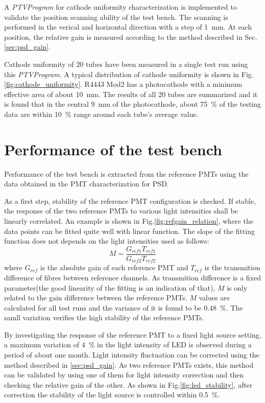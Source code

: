 \documentclass[5p, times]{elsarticle}
\begin{document}
A \textit{PTVProgram} for cathode uniformity characterization is implemented to validate the position scanning ability of the test bench.
The scanning is performed in the verical and horizontal direction with a step of \SI{1}{\milli\meter}.
At each position, the relative gain is measured according to the method described in Sec.\ref{sec:psd_gain}.

Cathode uniformity of 20 tubes have been measured in a single test run using this \textit{PTVProgram}.
A typical distribution of cathode uniformity is shown in Fig.\ref{fig:cathode_uniformity}.
R4443 Mod2 has a photocathode with a minimum effective area of about \SI{10}{\milli\meter}.
The results of all 20 tubes are summarized and it is found that in the central \SI{9}{\milli\meter} of the photocathode, about \SI{75}{\percent} of the testing data are within \textpm\SI{10}{\percent} range around each tube's average value.

\section{Performance of the test bench}
\label{sec:performance}

Performance of the test bench is extracted from the reference PMTs using the data obtained in the PMT characterization for PSD.

As a first step, stability of the reference PMT configuration is checked.
If stable, the response of the two reference PMTs to various light intensities shall be linearly correlated.
An example is shown in Fig.\ref{fig:refgain_relation}, where the data points can be fitted quite well with linear function.
The slope of the fitting function does not depends on the light intensities used as follows:
\begin{equation}
 M = \frac{G_{ref1} T_{ref1}}{G_{ref2} T_{ref2}}
\end{equation}
where $G_{ref}$ is the absolute gain of each reference PMT and $T_{ref}$ is the transmition difference of fibres between reference channels.
As transmition difference is a fixed parameter(the good linearity of the fitting is an indication of that), $M$ is only related to the gain difference between the reference PMTs.
$M$ values are calculated for all test runs and the variance of it is found to be \SI{0.48}{\percent}.
The samll variation verifies the high stability of the reference PMTs.

By investigating the response of the reference PMT to a fixed light source setting, a maximum variation of \SI{4}{\percent} in the light intensity of LED is observed during a period of about one month.
Light intensity fluctuation can be corrected using the method described in \ref{sec:psd_gain}.
As two reference PMTs exists, this method can be validated by using one of them for light intensity correction and then checking the relative gain of the other. 
As shown in Fig.\ref{fig:led_stability}, after correction the stability of the light source is controlled within \textpm\SI{0.5}{\percent}.
\end{document}
